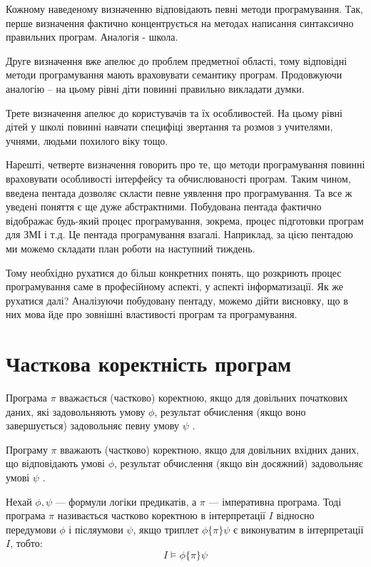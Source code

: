 \documentclass[a4paper,12pt, titlepage]{article}
\begin{document}
    Кожному наведеному визначенню відповідають певні
    методи програмування.
    Так, перше визначення фактично концентрується на
    методах написання синтаксично правильних програм.
    Аналогія - школа.

    Друге визначення вже апелює до проблем предметної
    області, тому відповідні методи програмування мають
    враховувати семантику програм. Продовжуючи
    аналогію – на цьому рівні діти повинні правильно
    викладати думки.

    Трете визначення апелює до користувачів та їх
    особливостей. На цьому рівні дітей у школі повинні
    навчати специфіці звертання та розмов з учителями,
    учнями, людьми похилого віку тощо.

    Нарешті, четверте визначення говорить про те, що
    методи програмування повинні враховувати
    особливості інтерфейсу та обчислюваності програм.
    Таким чином, введена пентада дозволяє скласти певне
    уявлення про програмування. Та все ж уведені поняття
    є ще дуже абстрактними. Побудована пентада фактично
    відображає будь-який процес програмування, зокрема,
    процес підготовки програм для ЗМІ і т.д. Це пентада
    програмування взагалі. Наприклад, за цією пентадою
    ми можемо складати план роботи на наступний
    тиждень.

    Тому необхідно рухатися до більш конкретних понять,
    що розкриють процес програмування саме в
    професійному аспекті, у аспекті інформатизації. Як же
    рухатися далі? Аналізуючи побудовану пентаду,
    можемо дійти висновку, що в них мова йде про
    зовнішні властивості програм та програмування.

    \section{Часткова коректність програм}
    Програма $\pi$ вважається (частково)
    коректною, якщо для довільних
    початкових даних, які задовольняють
    умову $\phi$, результат обчислення (якщо
    воно завершується) задовольняє певну
    умову $\psi$ .

    Програму $\pi$ вважають (частково)
    коректною, якщо для довільних вхідних
    даних, що відповідають умові $\phi$,
    результат обчислення (якщо він
    досяжний) задовольняє умові $\psi$ .

    Нехай $\phi, \psi$ — формули логіки предикатів, а $\pi$ —
    імперативна програма.
    Тоді програма $\pi$ називається частково коректною в
    інтерпретації $I$ відносно передумови $\phi$ і післяумови
    $\psi$, якщо триплет $\phi\{\pi\}\psi$ є виконуватим в інтерпретації $I$,
    тобто:
    \begin{equation*}
        I \vDash \phi\{\pi\}\psi
    \end{equation*}
\end{document}
